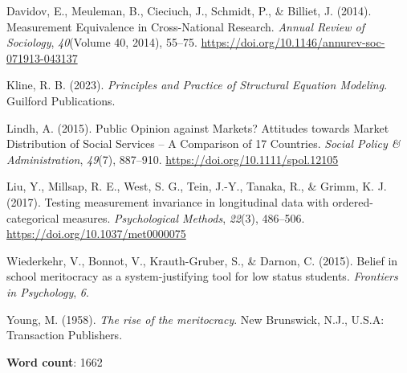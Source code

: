 \documentclass[
  12pt,
  letterpaper,
]{article}
\newlength{\cslhangindent}
\newenvironment{CSLReferences}[2] %
 {\begin{list}{}{%
  \setlength{\itemindent}{0pt}
  \setlength{\leftmargin}{0pt}
  \setlength{\parsep}{0pt}
  \ifodd #1
   \setlength{\leftmargin}{\cslhangindent}
   \setlength{\itemindent}{-1\cslhangindent}
  \fi
  \setlength{\itemsep}{#2\baselineskip}}}
 {\end{list}}
\begin{document}
\begin{CSLReferences}{1}{0}
Davidov, E., Meuleman, B., Cieciuch, J., Schmidt, P., \& Billiet, J.
(2014). Measurement {Equivalence} in {Cross-National Research}.
\emph{Annual Review of Sociology}, \emph{40}(Volume 40, 2014), 55--75.
\url{https://doi.org/10.1146/annurev-soc-071913-043137}

Kline, R. B. (2023). \emph{Principles and {Practice} of {Structural
Equation Modeling}}. Guilford Publications.

Lindh, A. (2015). Public {Opinion} against {Markets}? {Attitudes}
towards {Market Distribution} of {Social Services} -- {A Comparison} of
17 {Countries}. \emph{Social Policy \& Administration}, \emph{49}(7),
887--910. \url{https://doi.org/10.1111/spol.12105}

Liu, Y., Millsap, R. E., West, S. G., Tein, J.-Y., Tanaka, R., \& Grimm,
K. J. (2017). Testing measurement invariance in longitudinal data with
ordered-categorical measures. \emph{Psychological Methods},
\emph{22}(3), 486--506. \url{https://doi.org/10.1037/met0000075}

Wiederkehr, V., Bonnot, V., Krauth-Gruber, S., \& Darnon, C. (2015).
Belief in school meritocracy as a system-justifying tool for low status
students. \emph{Frontiers in Psychology}, \emph{6}.

Young, M. (1958). \emph{The rise of the meritocracy}. New Brunswick,
N.J., U.S.A: Transaction Publishers.

\end{CSLReferences}

\textbf{Word count}: 1662
\end{document}
